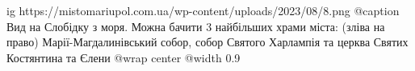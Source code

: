  
 
 
 
 

\ifcmt
  ig https://mistomariupol.com.ua/wp-content/uploads/2023/08/8.png
	@caption Вид на Слобідку з моря. Можна бачити 3 найбільших храми міста: (зліва на право) Марії-Магдалинівський собор, собор Святого Харлампія та церква Святих Костянтина та Єлени
  @wrap center
  @width 0.9
\fi
